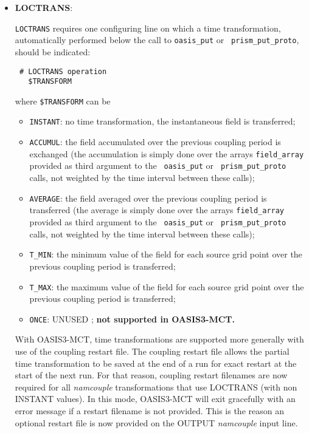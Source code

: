 \begin{itemize}

\item {\bf LOCTRANS}:

{\tt LOCTRANS} requires one configuring line on which a time
transformation, automatically performed below the call to
{\tt oasis\_put} or {\tt
  prism\_put\_proto}, should be indicated:

  \begin{verbatim}
 # LOCTRANS operation
   $TRANSFORM
  \end{verbatim}
\vspace{-0.5cm} 
where {\tt \$TRANSFORM} can be

  \begin{itemize}
    \item {\tt INSTANT}: no time transformation, the instantaneous field is
    transferred; 
    \item {\tt ACCUMUL}: the field accumulated over the previous coupling
    period is exchanged (the accumulation is simply done over the arrays
    {\tt field\_array}  provided as third argument to the {\tt
      oasis\_put} or {\tt
    prism\_put\_proto} calls, not weighted by the time interval
    between these calls);
    \item {\tt AVERAGE}: the field averaged over the previous coupling
    period is transferred (the average is simply done over the arrays
    {\tt field\_array} provided as third argument to the {\tt
      oasis\_put} or {\tt
    prism\_put\_proto} calls, not weighted by the time interval
    between these calls);
    \item {\tt T\_MIN}: the minimum value of the field
    for each source grid point over the previous coupling period is
    transferred; 
    \item {\tt T\_MAX}: the maximum value of the field for each source grid
    point over the previous coupling period is transferred;
    \item {\tt ONCE}: UNUSED ; {\bf not supported in OASIS3-MCT.}
  \end{itemize}

With OASIS3-MCT, time transformations are supported more generally
with use of the coupling restart file.  The coupling restart file allows the partial
time transformation to be saved at the end of a run for exact
restart at the start of the next run.  For that reason, coupling restart
filenames are now required for all {\it namcouple} transformations that use
LOCTRANS (with non INSTANT values).  In this mode, OASIS3-MCT will exit
gracefully with an error message if a restart filename is not provided.
This is the reason an optional restart file is now provided on the
OUTPUT {\it namcouple} input line.
\end{itemize}

